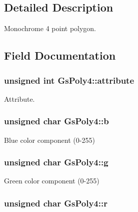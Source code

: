 \subsection{Detailed Description}
Monochrome 4 point polygon. 

\subsection{Field Documentation}
\hypertarget{structGsPoly4_ad58474b481cf8e41873f003916501985}{}
\subsubsection[{attribute}]{\setlength{\rightskip}{0pt plus 5cm}unsigned int Gs\+Poly4\+::attribute}\label{structGsPoly4_ad58474b481cf8e41873f003916501985}


Attribute. 

\hypertarget{structGsPoly4_ac720646ffe072a66a671f937b0d0ff26}{}
\subsubsection[{b}]{\setlength{\rightskip}{0pt plus 5cm}unsigned char Gs\+Poly4\+::b}\label{structGsPoly4_ac720646ffe072a66a671f937b0d0ff26}


Blue color component (0-\/255) 

\hypertarget{structGsPoly4_ad70029bd2ddc16663cee9e48c44bb290}{}
\subsubsection[{g}]{\setlength{\rightskip}{0pt plus 5cm}unsigned char Gs\+Poly4\+::g}\label{structGsPoly4_ad70029bd2ddc16663cee9e48c44bb290}


Green color component (0-\/255) 

\hypertarget{structGsPoly4_a80a1e6da3f60059a0de5d35b3c362b39}{}
\subsubsection[{r}]{\setlength{\rightskip}{0pt plus 5cm}unsigned char Gs\+Poly4\+::r}\label{structGsPoly4_a80a1e6da3f60059a0de5d35b3c362b39}


